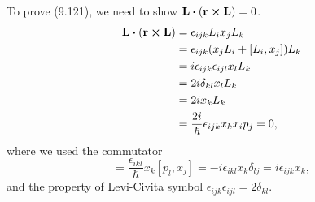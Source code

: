 \documentclass[10pt]{article}
\begin{document}
To prove (9.121), we need to show $\vb{L}\vdot(\vb{r} \cross \vb{L}) = 0$.
\begin{align*}
	\vb{L}\vdot(\vb{r} \cross \vb{L}) &= \epsilon_{ijk} L_i x_j L_k \\
	&= \epsilon_{ijk} (x_j L_i + [L_i, x_j]) L_k \\
	&= i \epsilon_{ijk} \epsilon_{ijl} x_l L_k \\
	&= 2i \delta_{kl} x_l L_k \\
	&= 2i x_k L_k \\
	&= \frac{2i}{\hbar} \epsilon_{ijk} x_k x_i p_j = 0,
\end{align*}
where we used the commutator
\begin{equation}
	[L_i, x_j] = \frac{\epsilon_{ikl}}{\hbar} x_k [p_l, x_j] = -i \epsilon_{ikl} x_k \delta_{lj} = i \epsilon_{ijk} x_k,
\end{equation}
and the property of Levi-Civita symbol $\epsilon_{ijk} \epsilon_{ijl} = 2 \delta_{kl}$.
\end{document}
